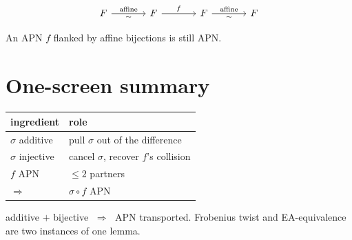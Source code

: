 \documentclass[11pt]{article}
\begin{document}
\[
\begin{tikzcd}[column sep=large]
F \arrow[r, "{\text{affine}}", "\sim"'] & F \arrow[r, "f"] & F \arrow[r, "{\text{affine}}", "\sim"'] & F
\end{tikzcd}
\]
\begin{center}\small An APN $f$ flanked by affine bijections is still APN.\end{center}

\bigskip

\section*{One-screen summary}

\begin{center}
\renewcommand{\arraystretch}{1.6}
\begin{tabular}{l l}
\textbf{ingredient} & \textbf{role} \\
\hline
$\sigma$ additive & pull $\sigma$ out of the difference \\
$\sigma$ injective & cancel $\sigma$, recover $f$'s collision \\
$f$ APN & $\le 2$ partners \\
$\Rightarrow$ & $\sigma\circ f$ APN \\
\end{tabular}
\end{center}

\bigskip
\noindent
\colorbox{leanbg}{\parbox{\dimexpr\linewidth-2\fboxsep}{\centering
additive $+$ bijective $\;\Rightarrow\;$ APN transported.\;\;
Frobenius twist and EA-equivalence are two instances of one lemma.}}
\end{document}
